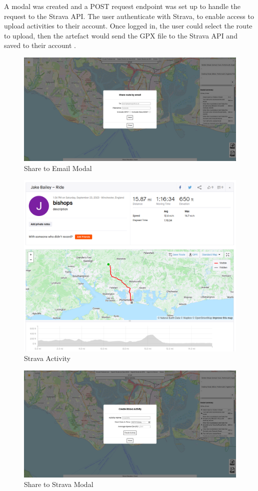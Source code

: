 A modal was created  and a POST request endpoint was set up to handle the request to the Strava API. The user authenticate with Strava, to enable access to upload activities to their account. Once logged in, the user could select the route to upload, then the artefact would send the GPX file to the Strava API and saved to their account .

\begin{figure}[!ht]
  \centering
  \includegraphics[width=425px]{figures/Progress Images/Iteration-2/SR17/SR17png.png}
  \caption{Share to Email Modal}
  \label{fig:share-email-modal}
\end{figure}

\begin{figure}[!ht]
  \centering
  \includegraphics[width=425px]{figures/Progress Images/Iteration-2/SR18/SR18 Upload Example 1.png}
  \caption{Strava Activity}
  \label{fig:strava-example}
\end{figure}

\begin{figure}[!ht]
  \centering
  \includegraphics[width=425px]{figures/Progress Images/Iteration-2/SR18/SR18 Strava Modal.png}
  \caption{Share to Strava Modal}
  \label{fig:strava-modal}
\end{figure}


